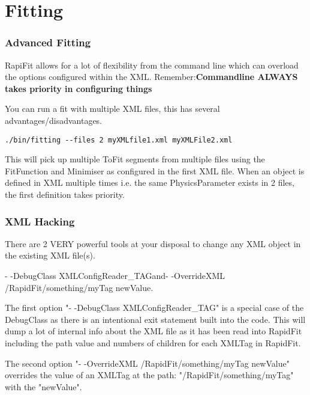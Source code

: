 \documentclass{beamer}
\begin{document}
\section{Fitting}
\begin{frame}[fragile]
\frametitle{Advanced Fitting}
\footnotesize
RapiFit allows for a lot of flexibility from the command line which can overload the options configured within the XML.\newline
Remember:\newline \textbf{Commandline ALWAYS takes priority in configuring things}\newline

You can run a fit with multiple XML files, this has several advantages/disadvantages.\newline
\begin{lstlisting}[tabsize=8]
  ./bin/fitting --files 2 myXMLfile1.xml myXMLFile2.xml
\end{lstlisting}

This will pick up multiple ToFit segments from multiple files using the FitFunction and Minimiser as configured in the first XML file.\newline
When an object is defined in XML multiple times i.e. the same PhysicsParameter exists in 2 files, the first definition takes priority.\newline


\end{frame}

\begin{frame}
\frametitle{XML Hacking}
\footnotesize
There are 2 VERY powerful tools at your disposal to change any XML object in the existing XML file(s).\newline

\tiny\textrm{- -DebugClass XMLConfigReader\_TAG}\newline and\newline \textrm{- -OverrideXML /RapidFit/something/myTag newValue}.\newline

\footnotesize
The first option "\textrm{- -DebugClass XMLConfigReader\_TAG}" is a special case of the DebugClass as there is an intentional exit statement built into the code.\newline
This will dump a lot of internal info about the XML file as it has been read into RapidFit including the path value and numbers of children for each XMLTag in RapidFit.\newline

The second option "\textrm{- -OverrideXML /RapidFit/something/myTag newValue}" overrides the value of an XMLTag at the path: "\textrm{/RapidFit/something/myTag}" with the "\textrm{newValue}".

\end{frame}
\end{document}
